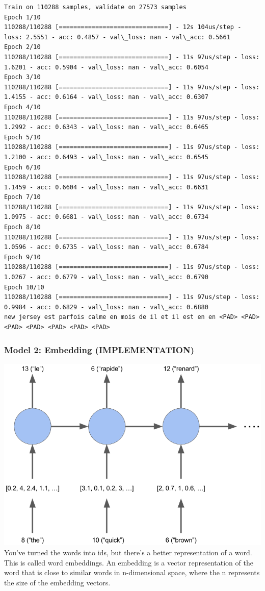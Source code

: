 \documentclass[11pt]{article}
\makeatletter
\def\maxwidth{\ifdim\Gin@nat@width>\linewidth\linewidth
    \else\Gin@nat@width\fi}
\let\Oldincludegraphics\includegraphics
\renewcommand{\includegraphics}[1]{\Oldincludegraphics[width=.8\maxwidth]{#1}}
\makeatother
\begin{document}
    \begin{Verbatim}[commandchars=\\\{\}]
Train on 110288 samples, validate on 27573 samples
Epoch 1/10
110288/110288 [==============================] - 12s 104us/step - loss: 2.5551 - acc: 0.4857 - val\_loss: nan - val\_acc: 0.5661
Epoch 2/10
110288/110288 [==============================] - 11s 97us/step - loss: 1.6201 - acc: 0.5904 - val\_loss: nan - val\_acc: 0.6054
Epoch 3/10
110288/110288 [==============================] - 11s 97us/step - loss: 1.4155 - acc: 0.6164 - val\_loss: nan - val\_acc: 0.6307
Epoch 4/10
110288/110288 [==============================] - 11s 97us/step - loss: 1.2992 - acc: 0.6343 - val\_loss: nan - val\_acc: 0.6465
Epoch 5/10
110288/110288 [==============================] - 11s 97us/step - loss: 1.2100 - acc: 0.6493 - val\_loss: nan - val\_acc: 0.6545
Epoch 6/10
110288/110288 [==============================] - 11s 97us/step - loss: 1.1459 - acc: 0.6604 - val\_loss: nan - val\_acc: 0.6631
Epoch 7/10
110288/110288 [==============================] - 11s 97us/step - loss: 1.0975 - acc: 0.6681 - val\_loss: nan - val\_acc: 0.6734
Epoch 8/10
110288/110288 [==============================] - 11s 97us/step - loss: 1.0596 - acc: 0.6735 - val\_loss: nan - val\_acc: 0.6784
Epoch 9/10
110288/110288 [==============================] - 11s 97us/step - loss: 1.0267 - acc: 0.6779 - val\_loss: nan - val\_acc: 0.6790
Epoch 10/10
110288/110288 [==============================] - 11s 97us/step - loss: 0.9984 - acc: 0.6829 - val\_loss: nan - val\_acc: 0.6880
new jersey est parfois calme en mois de il et il est en en <PAD> <PAD> <PAD> <PAD> <PAD> <PAD> <PAD>

    \end{Verbatim}

    \subsubsection{Model 2: Embedding
(IMPLEMENTATION)}\label{model-2-embedding-implementation}

\includegraphics{images/embedding.png} You've turned the words into ids,
but there's a better representation of a word. This is called word
embeddings. An embedding is a vector representation of the word that is
close to similar words in n-dimensional space, where the n represents
the size of the embedding vectors.
\end{document}
